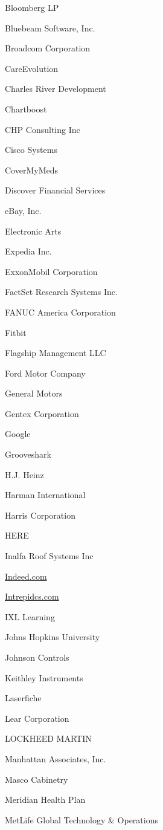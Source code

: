 \documentclass[twoside]{article}
\begin{document}
\begin{center}
\begin{multicols}{5}
\begin{FlushLeft}
\begin{compactitem}
\item Bloomberg LP
\item Bluebeam Software, Inc.
\item Broadcom Corporation
\item CareEvolution
\item Charles River Development
\item Chartboost
\item CHP Consulting Inc
\item Cisco Systems
\item CoverMyMeds
\item Discover Financial Services
\item eBay, Inc.
\item Electronic Arts
\item Expedia Inc.
\item ExxonMobil Corporation
\item FactSet Research Systems Inc.
\item FANUC America Corporation
\item Fitbit
\item Flagship Management LLC
\item Ford Motor Company
\item General Motors
\item Gentex Corporation
\item Google
\item Grooveshark
\item H.J. Heinz
\item Harman International
\item Harris Corporation
\item HERE
\item Inalfa Roof Systems Inc
\item \url{Indeed.com}
\item \url{Intrepidcs.com}
\item IXL Learning
\item Johns Hopkins University
\item Johnson Controls
\item Keithley Instruments
\item Laserfiche
\item Lear Corporation
\item LOCKHEED MARTIN
\item Manhattan Associates, Inc.
\item Masco Cabinetry
\item Meridian Health Plan
\item MetLife Global Technology \& Operations

\end{compactitem}
\end{FlushLeft}
\end{multicols}
\end{center}
\end{document}
